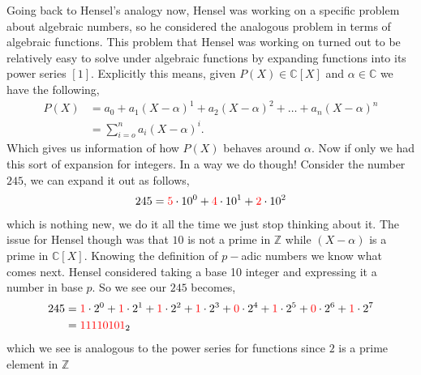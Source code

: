 \documentclass[12pt]{article}
\theoremstyle{definition}
\theoremstyle{remark}
\newcommand{\zz}{\mathbb Z}   %
\newcommand{\cc}{\mathbb C}   %
\newcommand{\lrb}[1]{\left[#1\right]}
\newcommand{\tcr}[1]{\textcolor{red}{#1}}
\begin{document}
Going back to Hensel's analogy now, Hensel was working on a specific problem about algebraic numbers, so he considered the analogous problem in terms of algebraic functions. This problem that Hensel was working on turned out to be relatively easy to solve under algebraic functions by expanding functions into its power series $\lrb{1}$. Explicitly this means, given $P(X) \in \cc[X]$ and $\alpha \in \cc$ we have the following,
\begin{align*}
  P(X) &= a_0 + a_1(X -\alpha)^{1} + a_2(X-\alpha)^{2} + \dots + a_n(X-\alpha)^{n} \\
  &= \sum_{i = o}^{n}a_i(X-\alpha)^{i}.
\end{align*}
Which gives us information of how $P(X)$ behaves around $\alpha$. Now if only we had this sort of expansion for integers. In a way we do though! Consider the number $245$, we can expand it out as follows,
\begin{align*}
  245 = \tcr{5}\cdot 10^{0} + \tcr{4}\cdot 10^{1} + \tcr{2} \cdot 10^{2}
\end{align*}
which is nothing new, we do it all the time we just stop thinking about it. The issue for Hensel though was that $10$ is not a prime in $\zz$ while $(X-\alpha)$ is a prime in $\cc[X]$. Knowing the definition of $p-$adic numbers we know what comes next. Hensel considered taking a base 10 integer and expressing it a number in base $p$. So we see our $245$ becomes,
\begin{align*}
  245 &= \tcr{1} \cdot 2^{0} + \tcr{1}\cdot 2^{1} + \tcr{1} \cdot 2^{2} + \tcr{1}\cdot 2^{3} + \tcr{0}\cdot 2^{4} + \tcr{1} \cdot 2^{5} + \tcr{0} \cdot 2^{6} + \tcr{1}\cdot 2^{7} \\
  &= \tcr{11110101}_2
\end{align*}
which we see is analogous to the power series for functions since $2$ is a prime element in $\zz$
\end{document}
